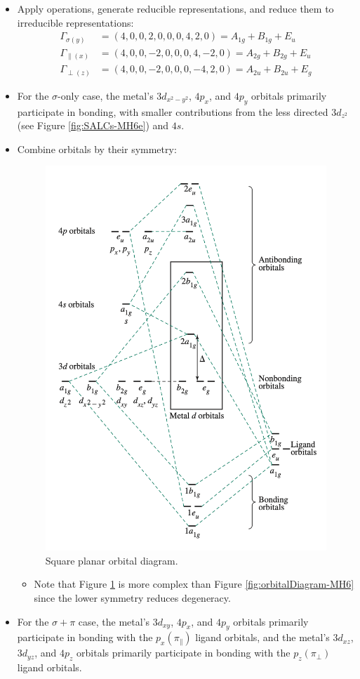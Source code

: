 \documentclass[../notes.tex]{subfiles}
\begin{document}
\begin{itemize}
\begin{itemize}
        \item Apply operations, generate reducible representations, and reduce them to irreducible representations:
        \begin{align*}
            \Gamma_{\sigma(y)} &= (4,0,0,2,0,0,0,4,2,0) = A_{1g}+B_{1g}+E_u\\
            \Gamma_{\parallel(x)} &= (4,0,0,-2,0,0,0,4,-2,0) = A_{2g}+B_{2g}+E_u\\
            \Gamma_{\perp(z)} &= (4,0,0,-2,0,0,0,-4,2,0) = A_{2u}+B_{2u}+E_g
        \end{align*}
        \item For the $\sigma$-only case, the metal's $3d_{x^2-y^2}$, $4p_x$, and $4p_y$ orbitals primarily participate in bonding, with smaller contributions from the less directed $3d_{z^2}$ (see Figure \ref{fig:SALCs-MH6e}) and $4s$.
        \item Combine orbitals by their symmetry:
        \begin{figure}[H]
            \centering
            \includegraphics[width=0.47\linewidth]{../ExtFiles/orbitalDiagram-MH4-squarePlanar.png}
            \caption{Square planar  orbital diagram.}
            \label{fig:orbitalDiagram-MH4-squarePlanar}
        \end{figure}
        \begin{itemize}
            \item Note that Figure \ref{fig:orbitalDiagram-MH4-squarePlanar} is more complex than Figure \ref{fig:orbitalDiagram-MH6} since the lower symmetry reduces degeneracy.
        \end{itemize}
        \item For the $\sigma+\pi$ case, the metal's $3d_{xy}$, $4p_x$, and $4p_y$ orbitals primarily participate in bonding with the $p_x(\pi_\parallel)$ ligand orbitals, and the metal's $3d_{xz}$, $3d_{yz}$, and $4p_z$ orbitals primarily participate in bonding with the $p_z(\pi_\perp)$ ligand orbitals.

\end{itemize}
\end{itemize}
\end{document}
